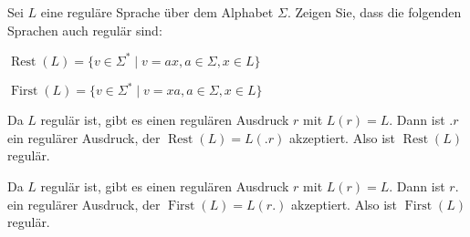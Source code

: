 Sei $L$ eine reguläre Sprache über dem Alphabet $\Sigma$.
Zeigen Sie, dass die folgenden Sprachen auch regulär sind:
\begin{teilaufgaben}
\item $\operatorname{Rest}(L)=\{v \in\Sigma^*\;|\; v=ax, a\in\Sigma, x\in L\}$
\item $\operatorname{First}(L)=\{v \in\Sigma^*\;|\; v=xa, a\in\Sigma, x\in L\}$
\end{teilaufgaben}

\begin{loesung}
\begin{teilaufgaben}
\item Da $L$ regulär ist, gibt es einen regulären Ausdruck $r$ mit
$L(r)=L$. Dann ist $.r$ ein regulärer Ausdruck, der
$\operatorname{Rest}(L)=L(.r)$ akzeptiert.
Also ist
$\operatorname{Rest}(L)$ regulär.
\item Da $L$ regulär ist, gibt es einen regulären Ausdruck $r$ mit
$L(r)=L$. Dann ist $r.$ ein regulärer Ausdruck, der
$\operatorname{First}(L)=L(r.)$ akzeptiert. Also ist
$\operatorname{First}(L)$ regulär.
\qedhere
\end{teilaufgaben}
\end{loesung}

